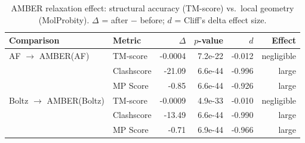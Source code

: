 \begin{table}[htbp]
\centering
\caption{AMBER relaxation effect: structural accuracy (TM-score) vs.\ local geometry (MolProbity). $\Delta$ = after $-$ before; $d$ = Cliff's delta effect size.}
\label{tab:amber-dual}
\begin{tabular}{llrrrr}
\toprule
Comparison & Metric & $\Delta$ & $p$-value & $d$ & Effect \\
\midrule
  AF $\to$ AMBER(AF) & TM-score & -0.0004 & 7.2e-22 & -0.012 & negligible \\
  & Clashscore & -21.09 & 6.6e-44 & -0.996 & large \\
  & MP Score & -0.85 & 6.6e-44 & -0.926 & large \\
  \midrule
  Boltz $\to$ AMBER(Boltz) & TM-score & -0.0009 & 4.9e-33 & -0.010 & negligible \\
  & Clashscore & -13.49 & 6.6e-44 & -0.990 & large \\
  & MP Score & -0.71 & 6.9e-44 & -0.966 & large \\
\bottomrule
\end{tabular}
\end{table}